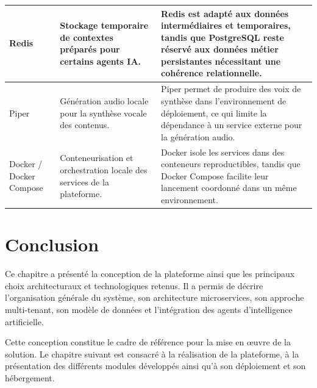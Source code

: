 \begin{longtable}{|p{2.5cm}|p{4cm}|p{9cm}|}
\hline
Redis & Stockage temporaire de contextes préparés pour certains agents IA. & Redis est adapté aux données intermédiaires et temporaires, tandis que PostgreSQL reste réservé aux données métier persistantes nécessitant une cohérence relationnelle. \\
\hline
Piper & Génération audio locale pour la synthèse vocale des contenus. & Piper permet de produire des voix de synthèse dans l'environnement de déploiement, ce qui limite la dépendance à un service externe pour la génération audio. \\
\hline
Docker / Docker Compose & Conteneurisation et orchestration locale des services de la plateforme. & Docker isole les services dans des conteneurs reproductibles, tandis que Docker Compose facilite leur lancement coordonné dans un même environnement. \\
\hline
\end{longtable}
\endgroup

\section{Conclusion}

Ce chapitre a présenté la conception de la plateforme ainsi que les principaux choix architecturaux et technologiques retenus. Il a permis de décrire l'organisation générale du système, son architecture microservices, son approche multi-tenant, son modèle de données et l'intégration des agents d'intelligence artificielle.

Cette conception constitue le cadre de référence pour la mise en œuvre de la solution. Le chapitre suivant est consacré à la réalisation de la plateforme, à la présentation des différents modules développés ainsi qu'à son déploiement et son hébergement.
\endinput

